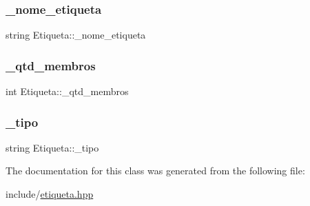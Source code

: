 \subsubsection{\texorpdfstring{\+\_\+nome\+\_\+etiqueta}{\_nome\_etiqueta}}
{\footnotesize\ttfamily string Etiqueta\+::\+\_\+nome\+\_\+etiqueta\hspace{0.3cm}{\ttfamily [protected]}}

\mbox{\label{classEtiqueta_af72d9ff60b84f4635e78f12ec8f80dab}} 
\subsubsection{\texorpdfstring{\+\_\+qtd\+\_\+membros}{\_qtd\_membros}}
{\footnotesize\ttfamily int Etiqueta\+::\+\_\+qtd\+\_\+membros\hspace{0.3cm}{\ttfamily [protected]}}

\mbox{\label{classEtiqueta_af4097d8bb6e190bb32c6bf70177f8b0c}} 
\subsubsection{\texorpdfstring{\+\_\+tipo}{\_tipo}}
{\footnotesize\ttfamily string Etiqueta\+::\+\_\+tipo\hspace{0.3cm}{\ttfamily [protected]}}



The documentation for this class was generated from the following file\+:\begin{DoxyCompactItemize}
\item 
include/\hyperlink{etiqueta_8hpp}{etiqueta.\+hpp}\end{DoxyCompactItemize}

